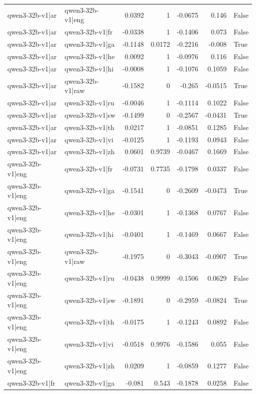 \begin{table}
\begin{tabular}{l l r r r r l}
qwen3-32b-v1|ar & qwen3-32b-v1|eng & 0.0392 & 1 & -0.0675 & 0.146 & False \\
qwen3-32b-v1|ar & qwen3-32b-v1|fr & -0.0338 & 1 & -0.1406 & 0.073 & False \\
qwen3-32b-v1|ar & qwen3-32b-v1|ga & -0.1148 & 0.0172 & -0.2216 & -0.008 & True \\
qwen3-32b-v1|ar & qwen3-32b-v1|he & 0.0092 & 1 & -0.0976 & 0.116 & False \\
qwen3-32b-v1|ar & qwen3-32b-v1|hi & -0.0008 & 1 & -0.1076 & 0.1059 & False \\
qwen3-32b-v1|ar & qwen3-32b-v1|raw & -0.1582 & 0 & -0.265 & -0.0515 & True \\
qwen3-32b-v1|ar & qwen3-32b-v1|ru & -0.0046 & 1 & -0.1114 & 0.1022 & False \\
qwen3-32b-v1|ar & qwen3-32b-v1|sw & -0.1499 & 0 & -0.2567 & -0.0431 & True \\
qwen3-32b-v1|ar & qwen3-32b-v1|th & 0.0217 & 1 & -0.0851 & 0.1285 & False \\
qwen3-32b-v1|ar & qwen3-32b-v1|vi & -0.0125 & 1 & -0.1193 & 0.0943 & False \\
qwen3-32b-v1|ar & qwen3-32b-v1|zh & 0.0601 & 0.9739 & -0.0467 & 0.1669 & False \\
qwen3-32b-v1|eng & qwen3-32b-v1|fr & -0.0731 & 0.7735 & -0.1798 & 0.0337 & False \\
qwen3-32b-v1|eng & qwen3-32b-v1|ga & -0.1541 & 0 & -0.2609 & -0.0473 & True \\
qwen3-32b-v1|eng & qwen3-32b-v1|he & -0.0301 & 1 & -0.1368 & 0.0767 & False \\
qwen3-32b-v1|eng & qwen3-32b-v1|hi & -0.0401 & 1 & -0.1469 & 0.0667 & False \\
qwen3-32b-v1|eng & qwen3-32b-v1|raw & -0.1975 & 0 & -0.3043 & -0.0907 & True \\
qwen3-32b-v1|eng & qwen3-32b-v1|ru & -0.0438 & 0.9999 & -0.1506 & 0.0629 & False \\
qwen3-32b-v1|eng & qwen3-32b-v1|sw & -0.1891 & 0 & -0.2959 & -0.0824 & True \\
qwen3-32b-v1|eng & qwen3-32b-v1|th & -0.0175 & 1 & -0.1243 & 0.0892 & False \\
qwen3-32b-v1|eng & qwen3-32b-v1|vi & -0.0518 & 0.9976 & -0.1586 & 0.055 & False \\
qwen3-32b-v1|eng & qwen3-32b-v1|zh & 0.0209 & 1 & -0.0859 & 0.1277 & False \\
qwen3-32b-v1|fr & qwen3-32b-v1|ga & -0.081 & 0.543 & -0.1878 & 0.0258 & False \\

\end{tabular}
\end{table}
